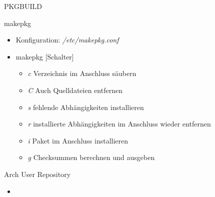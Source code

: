 \begin{slide}{PKGBUILD}
	
\end{slide}

\begin{slide}{makepkg}
	\begin{itemize}
		\item{Konfiguration: \textit{/etc/makepkg.conf}}
		\item{makepkg [Schalter]
			\begin{itemize}
				\item{\textit{c} Verzeichnis im Anschluss s\"{a}ubern}
				\item{\textit{C} Auch Quelldateien entfernen}
				\item{\textit{s} fehlende Abh\"{a}ngigkeiten installieren}
				\item{\textit{r} installierte Abh\"{a}ngigkeiten im Anschluss
					wieder entfernen}
				\item{\textit{i} Paket im Anschluss installieren}
				\item{\textit{g} Checksummen berechnen und ausgeben}
			\end{itemize}
		}
	\end{itemize}
\end{slide}

\begin{slide}{Arch User Repository}
	\begin{itemize}
		\item{}
	\end{itemize}
\end{slide}

